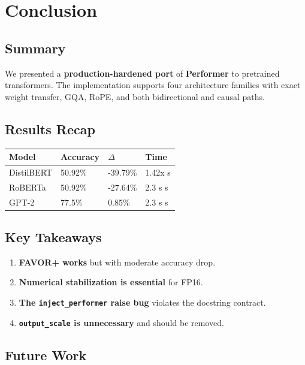 
\section{Conclusion}

\subsection{Summary}

We presented a \textbf{production-hardened port} of \textbf{Performer} to pretrained 
transformers. The implementation supports four architecture families with 
exact weight transfer, GQA, RoPE, and both bidirectional and causal paths.

\subsection{Results Recap}

\begin{table}[H]
\centering
\small
\begin{tabular}{llll}
\toprule
\textbf{Model} & \textbf{Accuracy} & \textbf{$\Delta$} & \textbf{Time} \\
\midrule
DistilBERT & 50.92\% & -39.79\% & 1.42x s \\
RoBERTa & 50.92\% & -27.64\% & 2.3 s s \\
GPT-2 & 77.5\% & 0.85\% & 2.3 s s \\
\bottomrule
\end{tabular}
\end{table}

\subsection{Key Takeaways}

\begin{enumerate}
\item \textbf{FAVOR+ works} but with moderate accuracy drop.
\item \textbf{Numerical stabilization is essential} for FP16.
\item \textbf{The \texttt{inject\_performer} raise bug} violates the docstring contract.
\item \textbf{\texttt{output\_scale} is unnecessary} and should be removed.

\end{enumerate}
\subsection{Future Work}


